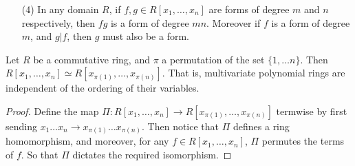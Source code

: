 \begin{example}
\begin{enumerate}
        \item[(4)] In any domain $R$, if  $f,g \in R[x_1, \dots, x_n]$ are forms
            of degree $m$ and  $n$ respectively, then $fg$ is a form of degree
            $mn$. Moreover if $f$ is a form of degree $m$, and $g|f$, then $g$
            must also be a form.
    \end{enumerate}
\end{example}

\begin{lemma}\label{1.1.3}
    Let $R$ be a commutative ring, and  $\pi$ a permutation of the set  $\{1,
    \dots n\}$. Then $R[x_1, \dots, x_n] \simeq R[x_{\pi(1)}, \dots,
    x_{\pi(n)}]$. That is, multivariate polynomial rings are independent of the
    ordering of their variables.
\end{lemma}
\begin{proof}
    Define the map $\Pi:R[x_1, \dots, x_n] \xrightarrow{} R[x_{\pi(1)}, \dots,
    x_{\pi(n)}]$ termwise by first sending $x_1 \dots x_n \xrightarrow{}
    x_{\pi(1)} \dots x_{\pi(n)}$. Then notice that $\Pi$ defines a ring
    homomorphism, and moreover, for any  $f \in R[x_1, \dots, x_n]$, $\Pi$
    permutes the terms of $f$. So that  $\Pi$ dictates the required isomorphism.
\end{proof}

